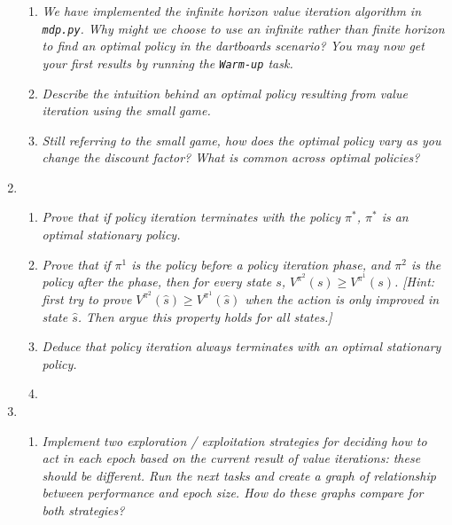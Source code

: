 \documentclass{article}
\begin{document}
\begin{enumerate}
\begin{enumerate}
  \item \emph{We have implemented the infinite horizon value iteration
  algorithm in \texttt{mdp.py}. Why might we choose to use an infinite rather
  than finite horizon to find an optimal policy in the dartboards scenario? 
  You may now get your first results by running the \texttt{Warm-up} task.}

  \item \emph{Describe the intuition behind an optimal policy resulting
  from value iteration using the small game.}

  \item \emph{Still referring to the small game, how does the optimal
  policy vary as you change the discount factor? What is common
  across optimal policies?}



  \end{enumerate}

\item 
  \begin{enumerate}
  \item \emph{Prove that if policy iteration terminates with the policy
  $\pi^*$, $\pi^*$ is an optimal stationary policy.}

  \item \emph{Prove that if $\pi^1$ is the policy before a policy iteration
  phase, and $\pi^2$ is the policy after the phase, then for every state $s$,
  $V^{\pi^2}(s)\geq V^{\pi^1}(s)$. [Hint: first try to prove $V^{\pi^2}(\hat s)\geq V^{\pi^1}(\hat s)$
  when the action is only improved in state $\hat s$. Then argue this property
  holds for all states.]}

  \item \emph{Deduce that policy iteration always terminates with an
  optimal stationary policy.}

  \item 

  \end{enumerate}

\item 
  \begin{enumerate}
  \item \emph{Implement two exploration / exploitation strategies for deciding how to act
  in each epoch based on the current result of value iterations: these should be different.
  Run the next tasks and create a graph of relationship between performance and epoch
  size. How do these graphs compare for both strategies?}


\end{enumerate}
\end{enumerate}
\end{document}
